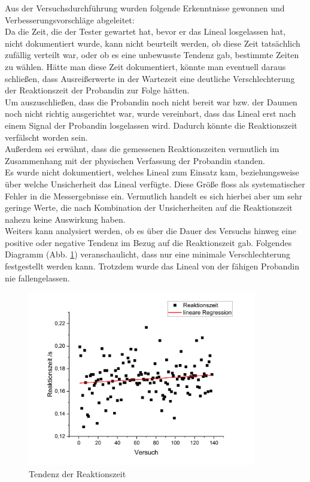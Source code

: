 \documentclass[a4paper,12pt]{article}
\begin{document}
Aus der Versuchsdurchführung wurden folgende Erkenntnisse gewonnen und Verbesserungsvorschläge abgeleitet:\\
Da die Zeit, die der Tester gewartet hat, bevor er das Lineal losgelassen hat, nicht dokumentiert wurde, 
kann nicht beurteilt werden, ob diese Zeit tatsächlich zufällig verteilt war, oder ob es eine unbewusste
Tendenz gab, bestimmte Zeiten zu wählen. Hätte man diese Zeit dokumentiert, könnte man eventuell daraus 
schließen, dass Ausreißerwerte in der Wartezeit eine deutliche Verschlechterung der Reaktionszeit der
Probandin zur Folge hätten.\\
Um auszuschließen, dass die Probandin noch nicht bereit war bzw. der Daumen noch nicht richtig ausgerichtet war,
wurde vereinbart, dass das Lineal erst nach einem Signal der Probandin losgelassen wird. Dadurch könnte die
Reaktionszeit verfälscht worden sein.\\
Außerdem sei erwähnt, dass die gemessenen Reaktionszeiten vermutlich im Zusammenhang mit der physischen
Verfassung der Probandin standen.\\
Es wurde nicht dokumentiert, welches Lineal zum Einsatz kam, beziehungsweise über welche Unsicherheit das Lineal verfügte.
Diese Größe floss als systematischer Fehler in die Messergebnisse ein. Vermutlich handelt es sich hierbei
aber um sehr geringe Werte, die nach Kombination der Unsicherheiten auf die Reaktionszeit nahezu keine
Auswirkung haben.\\

Weiters kann analysiert werden, ob es über die Dauer des Versuchs hinweg eine positive oder negative Tendenz im
Bezug auf die Reaktionszeit gab. Folgendes Diagramm (Abb. \ref{Abb:ReaktionszeitTendenz}) veranschaulicht, dass nur eine minimale Verschlechterung
festgestellt werden kann. Trotzdem wurde das Lineal von der fähigen Probandin nie fallengelassen.

\begin{figure}[H]
    \centering
    \includegraphics[width=10cm]{bilder/Tendenz1.png}          %
    \caption{Tendenz der Reaktionszeit}
    \label{Abb:ReaktionszeitTendenz}
\end{figure}
\end{document}
